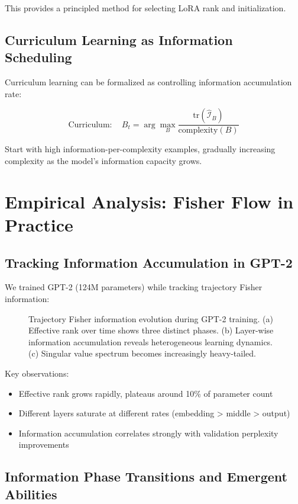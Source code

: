 \documentclass[11pt]{article}
\begin{document}
This provides a principled method for selecting LoRA rank and initialization.

\subsection{Curriculum Learning as Information Scheduling}

Curriculum learning can be formalized as controlling information accumulation rate:

\begin{equation}
\text{Curriculum}: \quad B_t = \arg\max_B \frac{\text{tr}(\hat{\mathcal{I}}_B)}{\text{complexity}(B)}
\end{equation}

Start with high information-per-complexity examples, gradually increasing complexity as the model's information capacity grows.

\section{Empirical Analysis: Fisher Flow in Practice}

\subsection{Tracking Information Accumulation in GPT-2}

We trained GPT-2 (124M parameters) while tracking trajectory Fisher information:

\begin{figure}[h]
\caption{Trajectory Fisher information evolution during GPT-2 training. (a) Effective rank over time shows three distinct phases. (b) Layer-wise information accumulation reveals heterogeneous learning dynamics. (c) Singular value spectrum becomes increasingly heavy-tailed.}
\end{figure}

Key observations:
\begin{itemize}
\item Effective rank grows rapidly, plateaus around 10\% of parameter count
\item Different layers saturate at different rates (embedding > middle > output)
\item Information accumulation correlates strongly with validation perplexity improvements
\end{itemize}

\subsection{Information Phase Transitions and Emergent Abilities}
\end{document}
